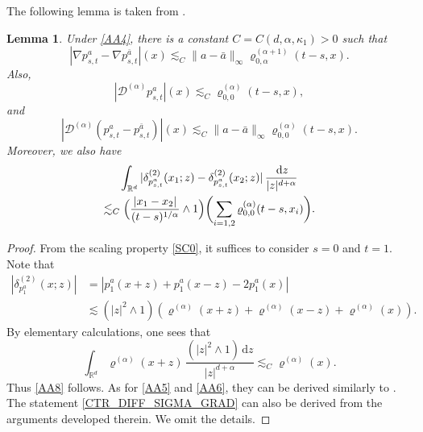 \documentclass[11pt]{article}
\numberwithin{equation}{section}\providecommand{\asymp}{\mathrel{\sim}}
\theoremstyle{plain}
\newtheorem{lemma}[theorem]{Lemma}
\theoremstyle{definition}
\newcommand\cD{{\mathcal D}}
\newcommand\mR{\mathbb{R}}
\newcommand\1{{\mathbf{1}}}
\newcommand{\dif}{\,\mathrm{d}}
\begin{document}
The following lemma is taken from \cite[Lem.\,3.2 \& 3.3]{Ch-Zh1}.
\begin{lemma} \label{Le210}
Under \eqref{AA4}, there is a constant $C=C(d,\alpha,\kappa_1)>0$ such that
\begin{equation}\label{CTR_DIFF_SIGMA_GRAD}
|\nabla p_{s,t}^a-\nabla p_{s,t}^{\bar a}|(x)\lesssim_C \|a-\bar a\|_\infty\varrho^{(\alpha+1)}_{0,\alpha}(t-s, x).
\end{equation}
Also,
\begin{equation}\label{AA8}
|\cD^{(\alpha)}p_{s,t}^a|(x)\lesssim_C\varrho^{(\alpha)}_{0,0}(t-s, x),
\end{equation}
and
\begin{equation}\label{AA5}
|\cD^{(\alpha)}(p_{s,t}^a-p_{s,t}^{\bar a})|(x)\lesssim_C\|a-\bar a\|_\infty\varrho^{(\alpha)}_{0,0}(t-s, x).
\end{equation}
Moreover, we also have
\begin{multline}\label{AA6}
\int_{\mR^d}|\delta^{(2)}_{p_{s,t}^a}(x_1;z)-\delta^{(2)}_{p_{s,t}^a}(x_2;z)|\,\frac{\dif z}{|z|^{d+\alpha}}
\\\lesssim_C\Bigl(\frac{|x_1-x_2|}{(t-s)^{1/\alpha}}\wedge 1\Bigr)\biggl(\sum_{i=1,2}\varrho^{(\alpha)}_{0,0}(t-s, x_i)\biggr).
\end{multline}
\end{lemma}
\begin{proof}
From the scaling property \eqref{SC0}, it suffices to consider $s=0$ and $t=1$. Note that
\begin{align*}
|\delta^{(2)}_{p_1^a}(x;z)|&=|p_1^a(x+z)+p_1^a(x-z)-2p_1^a(x)|\\
&\lesssim(|z|^2\wedge 1)(\varrho^{(\alpha)}(x+z)+\varrho^{(\alpha)}(x-z)+\varrho^{(\alpha)}(x)).
\end{align*}
By elementary calculations, one sees that
\begin{equation}\label{AA86}
\int_{\mR^d}\varrho^{(\alpha)}(x+z)\,\frac{(|z|^2\wedge 1)\dif z}{|z|^{d+\alpha}}\lesssim_C\varrho^{(\alpha)}(x).
\end{equation}
Thus \eqref{AA8} follows. As for \eqref{AA5} and \eqref{AA6}, they can be derived similarly
to \hbox{\cite[Lem.\,2.7 \& 2.8]{Ch-Zh20}}. The statement \eqref{CTR_DIFF_SIGMA_GRAD} can also be derived
from the arguments developed therein.
We omit the details.
\end{proof}
\end{document}
